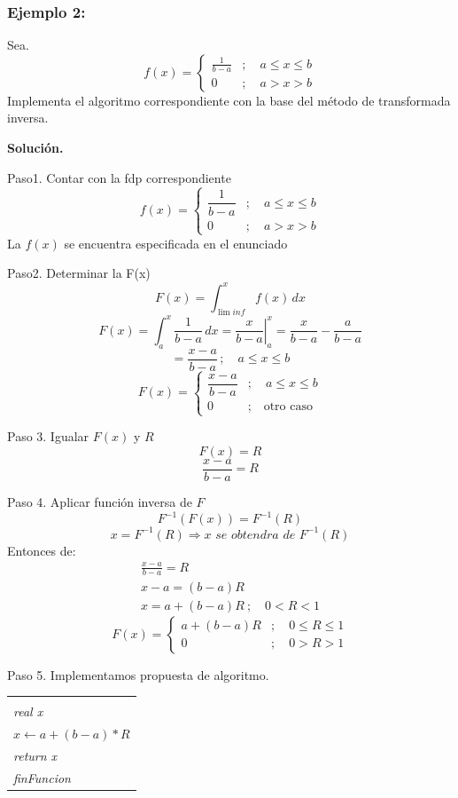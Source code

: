 \documentclass[11pt,letterpaper]{report}
\newenvironment{algoritmo}
  {\begin{center}\begin{tabular}{|p{0.85\textwidth}|}\hline\vspace{-0.2cm}\begin{tabbing}\hspace{0.6cm}\=\hspace{0.6cm}\=\hspace{0.6cm}\=\hspace{0.6cm}\=\hspace{0.6cm}\=\kill}
  {\end{tabbing}\vspace{-0.4cm}\\\hline\end{tabular}\end{center}}
\begin{document}
\subsubsection*{Ejemplo 2:}

Sea.
\[
f(x) = \begin{cases}
\frac{1}{b-a} & ;\quad a \leq x \leq b\\
0 & ;\quad a > x > b
\end{cases}
\]
Implementa el algoritmo correspondiente con la base del método de transformada inversa.

\textbf{Solución.}

Paso1. Contar con la fdp correspondiente
\[
f(x) = \begin{cases}
\dfrac{1}{b-a} & ;\quad a \leq x \leq b\\
0 & ;\quad a > x > b
\end{cases}
\]
La $f(x)$ se encuentra especificada en el enunciado

Paso2. Determinar la F(x)
\[
F(x) = \int_{\lim inf}^x f(x)\,dx
\]
\[
F(x) = \int_a^x \frac{1}{b-a}\,dx = \left.\frac{x}{b-a}\right|_a^x = \frac{x}{b-a} - \frac{a}{b-a}
\]
\[
= \frac{x-a}{b-a}\,;\quad a \leq x \leq b
\]
\[
F(x) = \begin{cases}
\dfrac{x-a}{b-a} & ;\quad a \leq x \leq b\\
0 & ;\quad \text{otro caso}
\end{cases}
\]

Paso 3. Igualar $F(x)$ y $R$
\[
F(x) = R
\]
\[
\frac{x-a}{b-a} = R
\]

Paso 4. Aplicar función inversa de $F$
\[
F^{-1}(F(x)) = F^{-1}(R)
\]
\[
x = F^{-1}(R) \Rightarrow x \textit{ se obtendra de } F^{-1}(R)
\]
Entonces de:
\begin{gather*}
\frac{x-a}{b-a} = R\\
x - a = (b-a)R\\
x = a + (b-a)R\ ;\quad 0 < R < 1
\end{gather*}
\[
F(x) = \begin{cases}
a + (b-a)R & ;\quad 0 \leq R \leq 1\\
0 & ;\quad 0 > R > 1
\end{cases}
\]

Paso 5. Implementamos propuesta de algoritmo.

\begin{algoritmo}
\textit{real funcion variableUniforme(entero a, entero b)}\\
\>\textit{real x}\\
\>$x \leftarrow a + (b - a) * R$\\
\>\textit{return x}\\
\textit{finFuncion}
\end{algoritmo}
\end{document}
